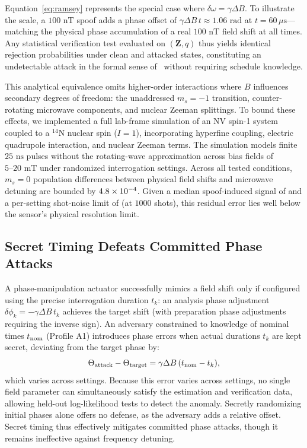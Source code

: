 \documentclass[conference]{IEEEtran}
\begin{document}
Equation~\eqref{eq:ramsey} represents the special case where $\delta\omega = \gamma\Delta B$. To illustrate the scale, a $100\text{~nT}$ spoof adds a phase offset of $\gamma\Delta B\,t \approx 1.06\text{~rad}$ at $t = 60\,\mu\text{s}$—matching the physical phase accumulation of a real $100\text{~nT}$ field shift at all times. Any statistical verification test evaluated on $(\mathbf Z,q)$ thus yields identical rejection probabilities under clean and attacked states, constituting an undetectable attack in the formal sense of~\cite{pasqualetti2013attack} without requiring schedule knowledge.

This analytical equivalence omits higher-order interactions where $B$ influences secondary degrees of freedom: the unaddressed $m_s = -1$ transition, counter-rotating microwave components, and nuclear Zeeman splittings. To bound these effects, we implemented a full lab-frame simulation of an NV spin-1 system coupled to a $^{14}\text{N}$ nuclear spin ($I=1$), incorporating hyperfine coupling, electric quadrupole interaction, and nuclear Zeeman terms. The simulation models finite $25\text{~ns}$ pulses without the rotating-wave approximation across bias fields of $5\text{--}20\text{~mT}$ under randomized interrogation settings. Across all tested conditions, $m_s = 0$ population differences between physical field shifts and microwave detuning are bounded by $4.8 \times 10^{-4}$. Given a median spoof-induced signal of \SpinSignal{} and a per-setting shot-noise limit of \SpinShotNoise{} (at $1000$ shots), this residual error lies well below the sensor's physical resolution limit.

\subsection{Secret Timing Defeats Committed Phase Attacks}

A phase-manipulation actuator successfully mimics a field shift only if configured using the precise interrogation duration $t_k$: an analysis phase adjustment $\delta\phi_k = -\gamma\Delta B\,t_k$ achieves the target shift (with preparation phase adjustments requiring the inverse sign). An adversary constrained to knowledge of nominal times $t_{\rm nom}$ (Profile A1) introduces phase errors when actual durations $t_k$ are kept secret, deviating from the target phase by:
\begin{equation}
 \Theta_{\rm attack}-\Theta_{\rm target}=\gamma\Delta B\,(t_{\rm nom}-t_k),
 \label{eq:residual}
\end{equation}
which varies across settings. Because this error varies across settings, no single field parameter can simultaneously satisfy the estimation and verification data, allowing held-out log-likelihood tests to detect the anomaly. Secretly randomizing initial phases alone offers no defense, as the adversary adds a relative offset. Secret timing thus effectively mitigates committed phase attacks, though it remains ineffective against frequency detuning.
\end{document}
